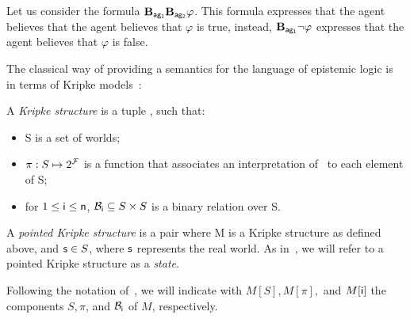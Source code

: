 \begin{example}
Let us consider the formula $\bB{ag_1}{\bB{ag_2}{\varphi}}$. This formula expresses that
the agent  believes that the agent  believes that $\varphi$ is true, instead,
$\bB{ag_1}\neg \varphi$ expresses that the agent  believes that $\varphi$ is false.
\end{example}
The classical way of providing a semantics for the language of epistemic logic is in terms
of Kripke models~\cite{Kripke1963-KRISCO}:
\begin{definition}
  A \emph{Kripke structure} is a tuple , such that:
  \begin{itemize}
  \item S is a set of worlds;
  \item $\pi: S \mapsto 2^{\mathcal{F}}$ is a function that associates an interpretation
  of \sF\ to each element of S; %
  \item for $1 \leq \mathsf{i} \leq \mathsf{n}$, $\mathcal{B}_{\mathsf{i}} \subseteq S \times S$  is a binary relation over S.
  \end{itemize}
\end{definition}
%
A \emph{pointed Kripke structure} is a pair  where M is a Kripke structure
as defined above, and $\mathsf{s} \in S$, where $\mathsf{s}$ represents the real world.
As in~\cite{baral2015action}, we will refer to a pointed Kripke structure
 as a \emph{state}.

Following the notation of~\cite{baral2015action}, we will indicate with
$M[S], M[\pi],$ and $M[\mathsf{i}]$ the components $S,\pi$, and $\mathcal{B}_{\mathsf{i}}$ of $M$,
respectively.



